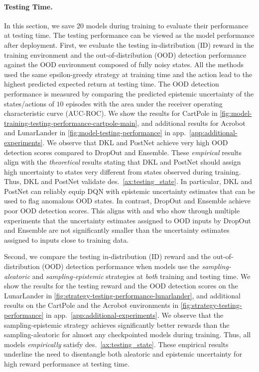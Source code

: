 
\paragraph{Testing Time.} In this section, we save $20$ models during training to evaluate their performance at testing time. The testing performance can be viewed as the model performance after deployment. First, we evaluate the testing in-distribution (ID) reward in the training environment and the out-of-distribution (OOD) detection performance against the OOD environment composed of fully noisy states. All the methods used the same epsilon-greedy strategy at training time and the action lead to the highest predicted expected return at testing time. The OOD detection performance is measured by comparing the predicted epistemic uncertainty of the states/actions of $10$ episodes with the area under the receiver operating characteristic curve (AUC-ROC). We show the results for CartPole in \cref{fig:model-training-testing-performance-cartpole-main}, and additional results for Acrobot and LunarLander in \cref{fig:model-testing-performance} in app.~\ref{app:additional-experiments}. We observe that DKL and PostNet achieve very high OOD detection scores compared to DropOut and Ensemble. These \emph{empirical} results align with the \emph{theoretical} results stating that DKL and PostNet should assign high uncertainty to states very different from states observed during training. Thus, DKL and PostNet validate des.~\ref{ax:testing_state}. In particular, DKL and PostNet can reliably equip DQN with epistemic uncertainty estimates that can be used to flag anomalous OOD states. In contrast, DropOut and Ensemble achieve poor OOD detection scores. This aligns with \citet{randomized-prior-functions} and \citet{natpn} who show through multiple experiments that the uncertainty estimates assigned to OOD inputs by DropOut and Ensemble are not significantly smaller than the uncertainty estimates assigned to inputs close to training data.

%
%
%

Second, we compare the testing in-distribution (ID) reward and the out-of-distribution (OOD) detection performance when models use the \emph{sampling-aleatoric} and \emph{sampling-epistemic} strategies at \emph{both} training and testing time. We show the results for the testing reward and the OOD detection scores on the LunarLander in \cref{fig:strategy-testing-performance-lunarlander}, and additional results on the CartPole and the Acrobot environments in \cref{fig:strategy-testing-performance} in app.~\ref{app:additional-experiments}. We observe that the sampling-epistemic strategy achieves significantly better rewards than the sampling-aleatoric for almost any checkpointed models during training. Thus, all models \emph{empirically} satisfy des.~\ref{ax:testing_state}. These empirical results underline the need to disentangle both aleatoric and epistemic uncertainty for high reward performance at testing time.


